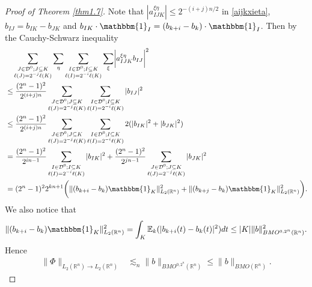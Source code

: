 \documentclass[oneside,english,a4wide]{amsart}
\numberwithin{equation}{section}
\numberwithin{figure}{section}
\theoremstyle{plain}
\theoremstyle{plain}
\theoremstyle{definition}
\theoremstyle{plain}
\theoremstyle{remark}
\theoremstyle{definition}
\theoremstyle{remark}
\theoremstyle{definition}
\newcommand{\8}{\infty}
\begin{document}
\begin{proof}[Proof of Theorem \ref{thm1.7}]
Note that
$|a_{IJK}^{\xi\eta}|\le 2^{-(i+j)n/2}$ in \eqref{aijkxieta}, $b_{IJ}=b_{IK}-b_{JK}$ and $b_{IK}\cdot \mathbbm{1}_I=(b_{k+i}-b_{k})\cdot \mathbbm{1}_I$. Then by the Cauchy-Schwarz inequality
\begin{equation}
	\begin{aligned}
		{}&\quad\sum_{\substack{J\in\mathcal{D}^0;J\subseteq K\\ \ell(J)=2^{-j}\ell(K)}}\sum_{\eta}\sum_{\substack{I\in\mathcal{D}^0;I\subseteq K\\ \ell(I)=2^{-i}\ell(K)}}\sum_{\xi}\biggl|a_{IJK}^{\xi\eta}b_{IJ}\biggr|^2\\
		&
		\le \frac{(2^n-1)^2}{2^{(i+j)n}}\sum_{\substack{J\in\mathcal{D}^0;J\subseteq K\\ \ell(J)=2^{-j}\ell(K)}}\sum_{\substack{I\in\mathcal{D}^0;I\subseteq K\\ \ell(I)=2^{-i}\ell(K)}}|b_{IJ}|^2\\
		&\leq \frac{(2^n-1)^2}{2^{(i+j)n}}\sum_{\substack{J\in\mathcal{D}^0;J\subseteq K\\ \ell(J)=2^{-j}\ell(K)}}\sum_{\substack{I\in\mathcal{D}^0;I\subseteq K\\ \ell(I)=2^{-i}\ell(K)}} 2(|b_{IK}|^2+|b_{JK}|^2)\\
		&= \frac{(2^{n}-1)^2}{2^{in-1}}\sum_{\substack{I\in\mathcal{D}^0;I\subseteq K\\ \ell(I)=2^{-i}\ell(K)}}|b_{IK}|^2+\frac{(2^{n}-1)^2}{2^{jn-1}}\sum_{\substack{J\in\mathcal{D}^0;J\subseteq K\\ \ell(J)=2^{-j}\ell(K)}}|b_{JK}|^2\\
		&=(2^{n}-1)^22^{kn+1}\bigg(\|(b_{k+i}-b_{k})\mathbbm{1}_K\|_{L_2(\mathbb{R}^n)}^2+\|(b_{k+j}-b_{k})\mathbbm{1}_K\|_{L_2(\mathbb{R}^n)}^2\bigg).
	\end{aligned}
\end{equation}
We also notice that
\begin{equation*}
	\begin{aligned}
		\|(b_{k+i}-b_{k})\mathbbm{1}_K\|_{L_2(\mathbb{R}^n)}^2=\int_K \mathbb{E}_k(|b_{k+i}(t)-b_k(t)|^2) dt\leq |K|\|b\|^2_{BMO^{0,2^n}(\mathbb{R}^n)}.
	\end{aligned}
\end{equation*}
Hence 
\begin{equation}\label{Nest}
	\begin{aligned}
		\|\varPhi\|_{L_2(\mathbb{R}^n)\to L_2(\mathbb{R}^n)}{}&\lesssim_{n} \|b\|_{BMO^{0, 2^n}(\mathbb{R}^n)}\leq\|b\|_{BMO(\mathbb{R}^n)}.
	\end{aligned}
\end{equation}


\end{proof}
\end{document}
